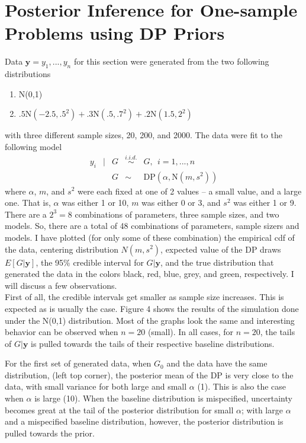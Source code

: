\documentclass{article}
\begin{document}
\newpage
\section{Posterior Inference for One-sample Problems using DP Priors}
Data $\mathbf y = y_1,...,y_n$ for this section were generated from 
the two following distributions
\begin{enumerate}
  \item N(0,1) 
  \item $.5$N$(-2.5, .5^2 ) + .3$N$(.5, .7^2 ) + .2$N$(1.5, 2^2 )$\\
\end{enumerate}
with three different sample sizes, 20, 200, and 2000. The data were fit 
to the following model
\[
  \begin{array}{rclcl}
    y_i &|& G &\overset{i.i.d.}{\sim}& G,~~ i = 1, ..., n \\
        &&  G &\sim& \text{DP}(\alpha, \text{N}(m,s^2) )
  \end{array}
\]
where $\alpha$, $m$, and $s^2$ were each fixed at one of 2 values -- a small
value, and a large one. That is, $\alpha$ was either 1 or 10, $m$ was either 0
or 3, and $s^2$ was either 1 or 9. There are a $2^3=8$ combinations of
parameters, three sample sizes, and two models. So, there are a total of 48
combinations of parameters, sample sizers and models. I have plotted (for only
some of these combination) the empirical cdf of the data, centering
distribution $N(m,s^2)$, expected value of the DP draws $E[G|\mathbf y]$, the
95\% credible interval for $G|\mathbf y$, and the true distribution that
generated the data in the colors black, red, blue, grey, and green,
respectively. I will discuss a few observations. \\

\noindent
First of all, the credible intervals get smaller as sample size increases. This
is expected as is usually the case. Figure 4 shows the results of the
simulation done under the N(0,1) distribution. Most of the graphs look the same
and interesting behavior can be observed when $n=20$ (small). In all cases, for
$n=20$, the tails of $G|\mathbf y$ is pulled towards the tails of their
respective baseline distributions. 

\noindent
For the first set of generated data, when $G_0$ and the data have the same
distribution, (left top corner), the posterior mean of the DP is very close to
the data, with small variance for both large and small $\alpha$ (1). This is also
the case when $\alpha$ is large (10). When the baseline distribution is mispecified,
uncertainty becomes great at the tail of the posterior distribution for small $\alpha$;
with large $\alpha$ and a mispecified baseline distribution, however, the posterior
distribution is pulled towards the prior.\\
\end{document}
